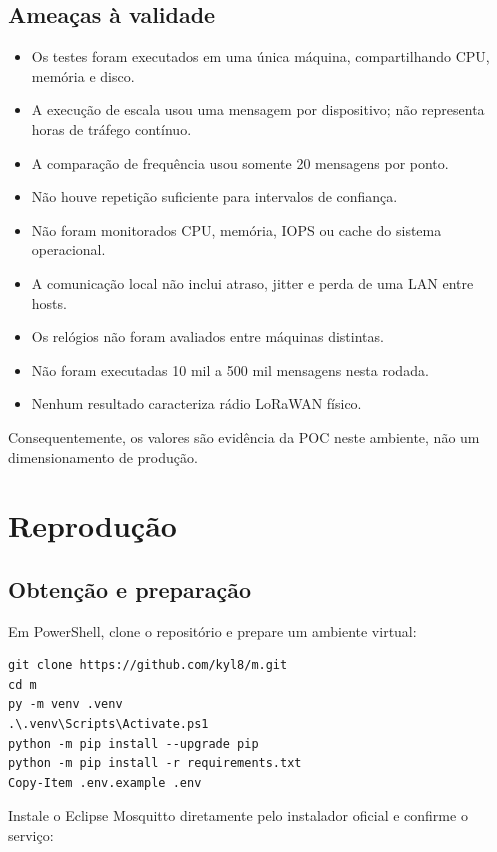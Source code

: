 \documentclass[12pt,a4paper]{article}
\begin{document}
\subsection{Ameaças à validade}

\begin{itemize}
  \item Os testes foram executados em uma única máquina, compartilhando CPU, memória e disco.
  \item A execução de escala usou uma mensagem por dispositivo; não representa horas de tráfego contínuo.
  \item A comparação de frequência usou somente 20 mensagens por ponto.
  \item Não houve repetição suficiente para intervalos de confiança.
  \item Não foram monitorados CPU, memória, IOPS ou cache do sistema operacional.
  \item A comunicação local não inclui atraso, jitter e perda de uma LAN entre hosts.
  \item Os relógios não foram avaliados entre máquinas distintas.
  \item Não foram executadas 10 mil a 500 mil mensagens nesta rodada.
  \item Nenhum resultado caracteriza rádio LoRaWAN físico.
\end{itemize}

Consequentemente, os valores são evidência da POC neste ambiente, não um dimensionamento de produção.

\section{Reprodução}

\subsection{Obtenção e preparação}

Em PowerShell, clone o repositório e prepare um ambiente virtual:

\begin{lstlisting}
git clone https://github.com/kyl8/m.git
cd m
py -m venv .venv
.\.venv\Scripts\Activate.ps1
python -m pip install --upgrade pip
python -m pip install -r requirements.txt
Copy-Item .env.example .env
\end{lstlisting}

Instale o Eclipse Mosquitto diretamente pelo instalador oficial e confirme o serviço:
\end{document}
